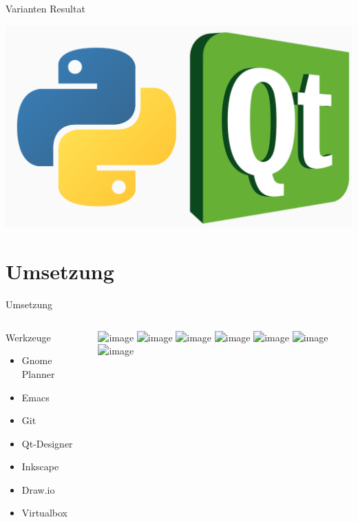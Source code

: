 \documentclass[aspectratio=1610]{beamer}
\begin{document}
\begin{frame}[label={sec:org3ae8797}]{Varianten}
\alert{Resultat}

\begin{center}
\includegraphics[height=.5\textheight]{pictures/pyqt.png}
\end{center}
\end{frame}

\section{Umsetzung}
\label{sec:org9a5dc75}
\begin{frame}[label={sec:orgd577d35}]{Umsetzung}
\begin{columns}
\begin{column}{0.3\columnwidth}
\alert{Werkzeuge}

\begin{itemize}
\item <2-> Gnome Planner
\item <3-> Emacs
\item <4-> Git
\item <5-> Qt-Designer
\item <6-> Inkscape
\item <7-> Draw.io
\item <8-> Virtualbox
\end{itemize}
\end{column}

\begin{column}{0.5\columnwidth}
\begin{center}
\includegraphics<2>[width=.9\linewidth]{pictures/tools1.png}%
\includegraphics<3>[width=.9\linewidth]{pictures/tools2.png}%
\includegraphics<4>[width=.9\linewidth]{pictures/tools3.png}%
\includegraphics<5>[width=.9\linewidth]{pictures/tools3.png}%
\includegraphics<6>[width=.9\linewidth]{pictures/tools5.png}%
\includegraphics<7>[width=.9\linewidth]{pictures/tools6.png}%
\includegraphics<8>[width=.9\linewidth]{pictures/tools7.png}%
\end{center}
\end{column}
\end{columns}
\end{frame}
\end{document}
